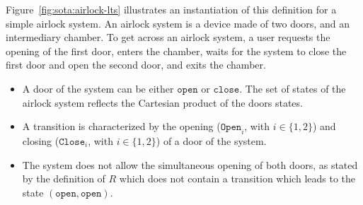 
\begin{example}
  \label{example:sota:airlocklts}
  Figure~\ref{fig:sota:airlock-lts} illustrates an instantiation of this
  definition for a simple airlock system.
  An airlock system is a device made of two doors, and an intermediary chamber.
  To get across an airlock system, a user requests the opening of the first
  door, enters the chamber, waits for the system to close the first door and
  open the second door, and exits the chamber.

  \begin{itemize}
  \item A door of the system can be either \( \mathtt{open} \) or
    \( \mathtt{close} \).
    The set of states of the airlock system reflects the Cartesian product of
    the doors states.
  \item A transition is characterized by the opening (\( \mathtt{Open}_i\), with
    \( i \in \{1, 2\} \)) and closing (\( \mathtt{Close}_i \), with
    \( i \in \{1, 2\} \)) of a door of the system.
  \item The system does not allow the simultaneous opening of both
    doors, as stated by the definition of \( R \) which does not contain a
    transition which leads to the state \( (\mathtt{open}, \mathtt{open}) \).
  \end{itemize}
\end{example}

